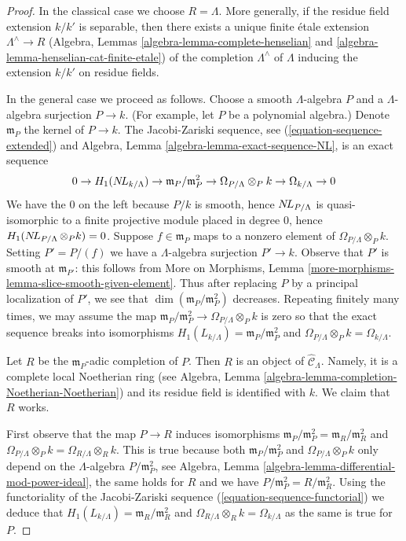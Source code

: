 \begin{proof}
In the classical case we choose $R = \Lambda$. More generally, if
the residue field extension $k/k'$ is separable, then there exists
a unique finite \'etale extension $\Lambda^\wedge \to R$
(Algebra, Lemmas \ref{algebra-lemma-complete-henselian} and
\ref{algebra-lemma-henselian-cat-finite-etale})
of the completion $\Lambda^\wedge$ of $\Lambda$
inducing the extension $k/k'$ on residue fields.

\medskip\noindent
In the general case we proceed as follows. Choose a smooth
$\Lambda$-algebra $P$ and a $\Lambda$-algebra surjection $P \to k$.
(For example, let $P$ be a polynomial algebra.)
Denote $\mathfrak m_P$ the kernel of $P \to k$. The Jacobi-Zariski sequence,
see (\ref{equation-sequence-extended}) and 
Algebra, Lemma \ref{algebra-lemma-exact-sequence-NL}, is an
exact sequence
$$
0 \to H_1(\mathop{N\!L}\nolimits_{k/\Lambda}) \to
\mathfrak m_P/\mathfrak m_P^2 \to
\Omega_{P/\Lambda} \otimes_P k \to
\Omega_{k/\Lambda} \to 0
$$
We have the $0$ on the left because $P/k$ is smooth, hence
$\mathop{N\!L}\nolimits_{P/\Lambda}$ is quasi-isomorphic to a finite projective module
placed in degree $0$, hence $H_1(\mathop{N\!L}\nolimits_{P/\Lambda} \otimes_P k) = 0$.
Suppose $f \in \mathfrak m_P$ maps to a nonzero element
of $\Omega_{P/\Lambda} \otimes_P k$. Setting $P' = P/(f)$ we have a
$\Lambda$-algebra surjection $P' \to k$.
Observe that $P'$ is smooth at $\mathfrak m_{P'}$:
this follows from More on Morphisms, Lemma
\ref{more-morphisms-lemma-slice-smooth-given-element}.
Thus after replacing $P$ by a principal localization
of $P'$, we see that $\dim(\mathfrak m_P/\mathfrak m_P^2)$
decreases. Repeating finitely many times, we may assume
the map $\mathfrak m_P/\mathfrak m_P^2 \to
\Omega_{P/\Lambda} \otimes_P k$ is zero so that
the exact sequence breaks into isomorphisms
$H_1(L_{k/\Lambda}) = \mathfrak m_P/\mathfrak m_P^2$ and
$\Omega_{P/\Lambda} \otimes_P k = \Omega_{k/\Lambda}$.

\medskip\noindent
Let $R$ be the $\mathfrak m_P$-adic completion of $P$.
Then $R$ is an object of $\widehat{\mathcal{C}}_\Lambda$.
Namely, it is a complete local Noetherian ring (see
Algebra, Lemma \ref{algebra-lemma-completion-Noetherian-Noetherian})
and its residue field is identified with $k$.
We claim that $R$ works.

\medskip\noindent
First observe that the map $P \to R$ induces isomorphisms
$\mathfrak m_P/\mathfrak m_P^2 = \mathfrak m_R/\mathfrak m_R^2$
and $\Omega_{P/\Lambda} \otimes_P k = \Omega_{R/\Lambda} \otimes_R k$.
This is true because both $\mathfrak m_P/\mathfrak m_P^2$
and $\Omega_{P/\Lambda} \otimes_P k$ only depend on the
$\Lambda$-algebra $P/\mathfrak m_P^2$, see
Algebra, Lemma \ref{algebra-lemma-differential-mod-power-ideal},
the same holds for $R$ and we have $P/\mathfrak m_P^2 = R/\mathfrak m_R^2$.
Using the functoriality of the Jacobi-Zariski sequence
(\ref{equation-sequence-functorial})
we deduce that $H_1(L_{k/\Lambda}) = \mathfrak m_R/\mathfrak m_R^2$ and
$\Omega_{R/\Lambda} \otimes_R k = \Omega_{k/\Lambda}$
as the same is true for $P$.


\end{proof}
